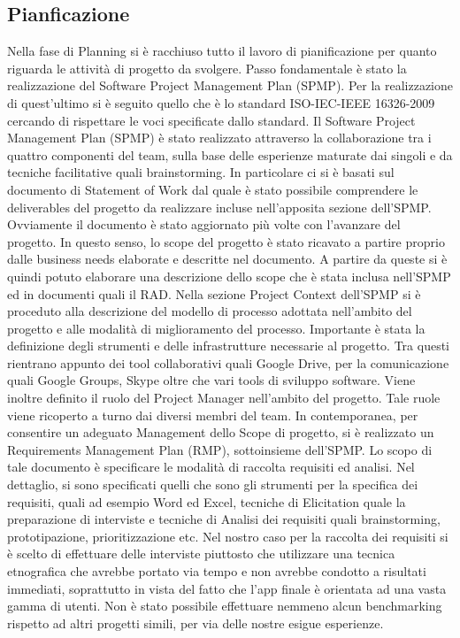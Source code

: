 \subsection{Pianficazione}
Nella fase di Planning si \`{e} racchiuso tutto il lavoro di pianificazione per quanto riguarda le attivit\`{a} di progetto da svolgere. Passo fondamentale \`{e} stato la realizzazione del Software Project Management Plan (SPMP). Per la realizzazione di quest\rq ultimo si \`{e} seguito quello che \`{e} lo standard ISO-IEC-IEEE 16326-2009 cercando di rispettare le voci specificate dallo standard.
Il Software Project Management Plan (SPMP) \`{e} stato realizzato attraverso la collaborazione tra i quattro componenti del team, sulla base delle esperienze maturate dai singoli e da tecniche facilitative quali brainstorming.
In particolare ci si \`{e} basati sul documento di Statement of Work dal quale \`{e} stato possibile comprendere le deliverables del progetto da realizzare incluse nell\rq apposita sezione dell\rq SPMP.
Ovviamente il documento \`{e} stato aggiornato pi\`{u} volte con l\rq avanzare del progetto. In questo senso, lo scope del progetto \`{e} stato ricavato a partire proprio dalle business needs elaborate e descritte nel documento.
A partire da queste si \`{e} quindi potuto elaborare una descrizione dello scope che \`{e} stata inclusa nell\rq SPMP ed in documenti quali il RAD.
Nella sezione Project Context dell\rq SPMP si \`{e} proceduto alla descrizione del modello di processo adottata nell\rq ambito del progetto e alle modalit\`{a} di miglioramento del processo.
Importante \`{e} stata la definizione degli strumenti e delle infrastrutture necessarie al progetto. Tra questi rientrano appunto dei tool collaborativi quali Google Drive, per la comunicazione quali Google Groups, Skype oltre che vari tools di sviluppo software.
Viene inoltre definito il ruolo del Project Manager nell\rq ambito del progetto. Tale ruole viene ricoperto a turno dai diversi membri del team.
In contemporanea, per consentire un adeguato Management dello Scope di progetto, si \`{e} realizzato un Requirements Management Plan (RMP), sottoinsieme dell\rq SPMP. Lo scopo di tale documento \`{e} specificare le modalit\`{a} di raccolta requisiti ed analisi. 
Nel dettaglio, si sono specificati quelli che sono gli strumenti per la specifica dei requisiti, quali ad esempio Word ed Excel, tecniche di Elicitation quale la preparazione di interviste e tecniche di Analisi dei requisiti quali brainstorming, prototipazione, prioritizzazione etc.
Nel nostro caso per la raccolta dei requisiti si \`{e} scelto di effettuare delle interviste piuttosto che utilizzare una tecnica etnografica che avrebbe portato via tempo e non avrebbe condotto a risultati immediati, soprattutto in vista del fatto che l\rq app finale \`{e} orientata ad una vasta gamma di utenti. Non \`{e} stato possibile effettuare nemmeno alcun benchmarking rispetto ad altri progetti simili, per via delle nostre esigue esperienze.
